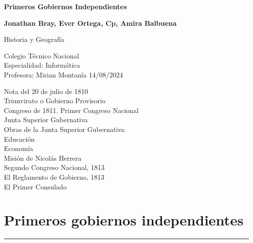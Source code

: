 \documentclass{article}
\begin{document}
\begin{titlepage}
  \begin{center}
      \vspace*{1cm}

      \Huge
      \textbf{Primeros Gobiernos Independientes}

      \vspace{0.5cm}
      \LARGE
      \vspace{1.5cm}

      \textbf{Jonathan Bray, Ever Ortega, Cp, Amira Balbuena}

      \vfill

      Historia y Geografía

      \vspace{0.8cm}


      \Large
      Colegio Técnico Nacional\\
      Especialidad: Informática\\
      Profesora: Mirian Montanía
      14/08/2024

  \end{center}
\end{titlepage}

  \Large
  \noindent Nota del 20 de julio de 1810\\
  \noindent Triunvirato o Gobierno Provisorio\\
  \noindent Congreso de 1811. Primer Congreso Nacional\\
  \noindent Junta Superior Gubernativa\\
  \noindent Obras de la Junta Superior Gubernativa\\
  \noindent Educación\\
  \noindent Economía\\
  \noindent Misión de Nicolás Herrera\\
  \noindent Segundo Congreso Nacional, 1813\\
  \noindent El Reglamento de Gobierno, 1813\\
  \noindent El Primer Consulado

  \normalsize
  \pagebreak
  
  \section*{\large Primeros gobiernos independientes}
  \hrule
  \vspace{0.5cm}
\end{document}
